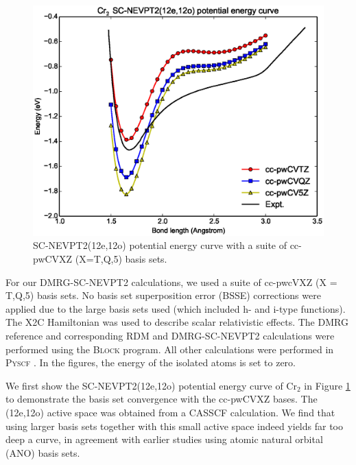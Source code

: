 \begin{figure}
  \includegraphics[width=1.1\columnwidth]{Cr2-nevpt2.eps}
  \caption{SC-NEVPT2(12e,12o) potential energy curve with a suite of cc-pwCVXZ (X=T,Q,5) basis sets. }
  \label{fig:12o_nevpt2}
\end{figure}

For our DMRG-SC-NEVPT2 calculations, we used a suite of cc-pwcVXZ (X = T,Q,5) basis sets. No basis set superposition error (BSSE) corrections were applied 
due to the large basis sets used (which included h- and i-type functions). The X2C Hamiltonian was used to describe scalar relativistic effects. 
The DMRG reference and corresponding RDM and DMRG-SC-NEVPT2 calculations were performed using the \textsc{Block} program\cite{sharma_spin-adapted_2012}. 
All other calculations were performed in \textsc{Pyscf} \cite{sun_pyscf}. In the figures, the energy of the isolated atoms is set to zero.

We first show the SC-NEVPT2(12e,12o) potential energy curve of Cr$_2$ in Figure \ref{fig:12o_nevpt2} 
to demonstrate the basis set convergence with the cc-pwCVXZ bases. The (12e,12o) active space was obtained from a CASSCF calculation. We find that
using larger basis sets together with this small active space indeed yields far too deep a curve, in agreement with earlier studies  using atomic natural orbital (ANO) basis sets.\cite{angeli_third-order_2006}

